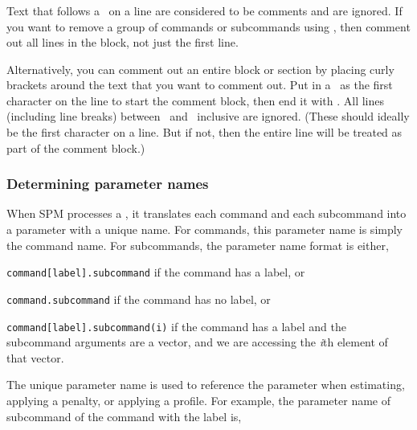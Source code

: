 \subsubsection{}

Text that follows a \commentline\ on a line are considered to be comments and are ignored. If you want to remove a group of commands or subcommands using \commentline, then comment out all lines in the block, not just the first line. 

Alternatively, you can comment out an entire block or section by placing curly brackets around the text that you want to comment out. Put in a \commentstart\ as the first character on the line to start the comment block, then end it with \commentend. All lines (including line breaks) between \commentstart\ and \commentend\ inclusive are ignored. (These should ideally be the first character on a line. But if not, then the entire line will be treated as part of the comment block.)

\subsubsection{Determining parameter names\label{sec:parameter-names}}

When SPM processes a \config, it translates each command and each subcommand into a parameter with a unique name. For commands, this parameter name is simply the command name. For subcommands, the parameter name format is either, 

\begin{description}
\item \texttt{command[label].subcommand} if the command has a label, or
\item \texttt{command.subcommand} if the command has no label, or
\item \texttt{command[label].subcommand(i)} if the command has a label and the subcommand arguments are a vector, and we are accessing the  \emph{i}th element of that vector. 
\end{description} 

The unique parameter name is used to reference the parameter when estimating, applying a penalty, or applying a profile. For example, the parameter name of subcommand  of the command  with the label  is,

